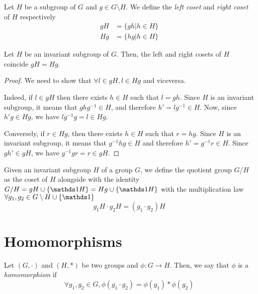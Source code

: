 \begin{definition}[Coset]
    Let $H$ be a subgroup of $G$ and $g \in G \setminus H$. We define the \emph{left coset} and \emph{right coset} of $H$ respectively
    \begin{align*}
        gH &= \{gh | h \in H\} \\
        Hg &= \{hg | h \in H\}
    \end{align*}
\end{definition}

\begin{proposition}
    Let $H$ be an invariant subgroup of $G$. Then, the left and right cosets of $H$ coincide $gH = Hg$.
\end{proposition}
\begin{proof}
    We need to show that $\forall l \in gH, l \in Hg$ and viceversa.

    Indeed, if $l \in gH$ then there exists $h \in H$ such that $l = gh$.
    Since $H$ is an invariant subgroup, it means that $ghg^{-1} \in H$, and therefore $h' = lg^{-1} \in H$. Now, since $h'g \in Hg$, we have $lg^{-1}g = l \in Hg$.
    
    Conversely, if $r \in Hg$, then there exists $h \in H$ such that $r = hg$.
    Since $H$ is an invariant subgroup, it means that $g^{-1}hg \in H$ and therefore $h' = g^{-1}r \in H$. Since $gh' \in gH$, we have $g^{-1}gr = r \in gH$.
\end{proof}

\begin{definition}
    Given an invariant subgroup $H$ of a group $G$, we define the quotient group $G/H$ as the coset of $H$ alongside with the identity $G/H = gH \cup \{\idop H\} = Hg \cup \{\idop H\}$ with the multiplication law $\forall g_1, g_2 \in G \setminus H \cup \{\idop\}$
    \begin{equation*}
        g_1H \cdot g_2H = (g_1 \cdot g_2) H
    \end{equation*}
\end{definition}


\section{Homomorphisms}

\begin{definition}[Homomorphism]
    Let $(G, \cdot)$ and $(H, \ast)$ be two groups and $\phi: G \rightarrow H$.
    Then, we say that $\phi$ is a \emph{homomorphism} if
    \begin{equation*}
        \forall g_1, g_2 \in G, \phi(g_1 \cdot g_2) = \phi(g_1) \ast \phi(g_2)
    \end{equation*}
\end{definition}

